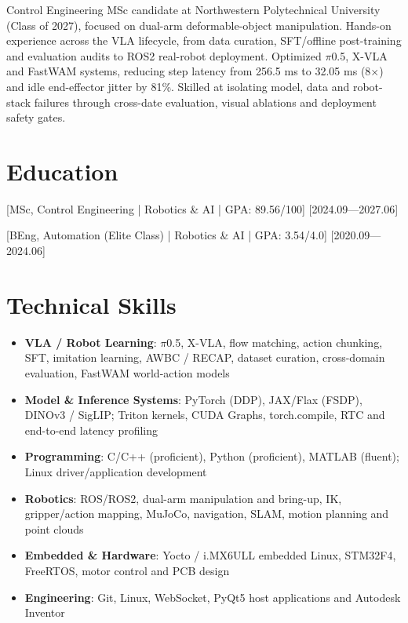 \documentclass{resume-photo}
\begin{document}

\ResumeTitle

\noindent Control Engineering MSc candidate at Northwestern Polytechnical University (Class of 2027), focused on dual-arm deformable-object manipulation. Hands-on experience across the VLA lifecycle, from data curation, SFT/offline post-training and evaluation audits to ROS2 real-robot deployment. Optimized $\pi$0.5, X-VLA and FastWAM systems, reducing step latency from 256.5 ms to 32.05 ms (8$\times$) and idle end-effector jitter by 81\%. Skilled at isolating model, data and robot-stack failures through cross-date evaluation, visual ablations and deployment safety gates.

\section{Education}
[\textnormal{MSc, Control Engineering | Robotics \& AI | GPA: 89.56/100}]
[2024.09—2027.06]

[\textnormal{BEng, Automation (Elite Class) | Robotics \& AI | GPA: 3.54/4.0}]
[2020.09—2024.06]

\section{Technical Skills}
\begin{itemize}
  \item \textbf{VLA / Robot Learning}: $\pi$0.5, X-VLA, flow matching, action chunking, SFT, imitation learning, AWBC / RECAP, dataset curation, cross-domain evaluation, FastWAM world-action models
  \item \textbf{Model \& Inference Systems}: PyTorch (DDP), JAX/Flax (FSDP), DINOv3 / SigLIP; Triton kernels, CUDA Graphs, torch.compile, RTC and end-to-end latency profiling
  \item \textbf{Programming}: C/C++ (proficient), Python (proficient), MATLAB (fluent); Linux driver/application development
  \item \textbf{Robotics}: ROS/ROS2, dual-arm manipulation and bring-up, IK, gripper/action mapping, MuJoCo, navigation, SLAM, motion planning and point clouds
  \item \textbf{Embedded \& Hardware}: Yocto / i.MX6ULL embedded Linux, STM32F4, FreeRTOS, motor control and PCB design
  \item \textbf{Engineering}: Git, Linux, WebSocket, PyQt5 host applications and Autodesk Inventor
\end{itemize}
\end{document}
